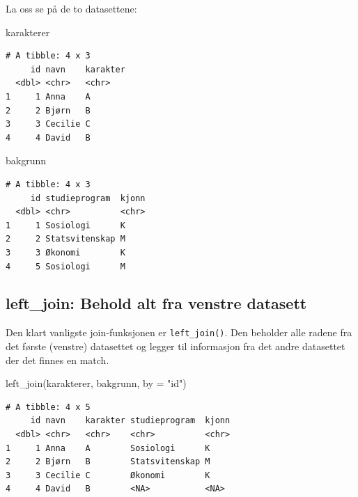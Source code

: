 \documentclass[
  norsk,
  letterpaper,
  DIV=11,
  numbers=noendperiod]{scrreprt}
\newenvironment{Shaded}{\begin{snugshade}}{\end{snugshade}}
\newcommand{\AttributeTok}[1]{\textcolor[rgb]{0.40,0.45,0.13}{#1}}
\newcommand{\FunctionTok}[1]{\textcolor[rgb]{0.28,0.35,0.67}{#1}}
\newcommand{\NormalTok}[1]{\textcolor[rgb]{0.00,0.23,0.31}{#1}}
\newcommand{\StringTok}[1]{\textcolor[rgb]{0.13,0.47,0.30}{#1}}
\theoremstyle{definition}
\theoremstyle{remark}
\begin{document}
La oss se på de to datasettene:

\begin{Shaded}
\begin{Highlighting}[]
\NormalTok{karakterer}
\end{Highlighting}
\end{Shaded}

\begin{verbatim}
# A tibble: 4 x 3
     id navn    karakter
  <dbl> <chr>   <chr>   
1     1 Anna    A       
2     2 Bjørn   B       
3     3 Cecilie C       
4     4 David   B       
\end{verbatim}

\begin{Shaded}
\begin{Highlighting}[]
\NormalTok{bakgrunn}
\end{Highlighting}
\end{Shaded}

\begin{verbatim}
# A tibble: 4 x 3
     id studieprogram  kjonn
  <dbl> <chr>          <chr>
1     1 Sosiologi      K    
2     2 Statsvitenskap M    
3     3 Økonomi        K    
4     5 Sosiologi      M    
\end{verbatim}

\subsection{left\_join: Behold alt fra venstre
datasett}\label{left_join-behold-alt-fra-venstre-datasett}

Den klart vanligste join-funksjonen er \texttt{left\_join()}. Den
beholder alle radene fra det første (venstre) datasettet og legger til
informasjon fra det andre datasettet der det finnes en match.

\begin{Shaded}
\begin{Highlighting}[]
\FunctionTok{left\_join}\NormalTok{(karakterer, bakgrunn, }\AttributeTok{by =} \StringTok{"id"}\NormalTok{)}
\end{Highlighting}
\end{Shaded}

\begin{verbatim}
# A tibble: 4 x 5
     id navn    karakter studieprogram  kjonn
  <dbl> <chr>   <chr>    <chr>          <chr>
1     1 Anna    A        Sosiologi      K    
2     2 Bjørn   B        Statsvitenskap M    
3     3 Cecilie C        Økonomi        K    
4     4 David   B        <NA>           <NA> 
\end{verbatim}
\end{document}
